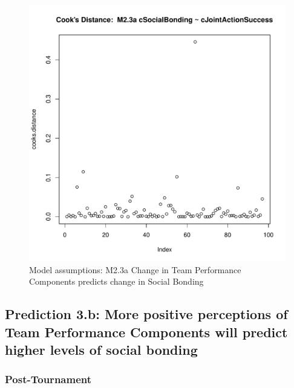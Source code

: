 \begin{figure}[htbp]
        \includegraphics[scale =.4]{images/MLM23aCooksD.pdf}
        \caption{Model assumptions: M2.3a Change in Team Performance Components predicts change in Social Bonding}
        \label{fig:MLM23aAssumptions}
      \end{figure}







      \subsection{Prediction 3.b: More positive perceptions of Team Performance Components will predict higher levels of social bonding}

      \subsubsection{Post-Tournament}

          
          \restoregeometry



